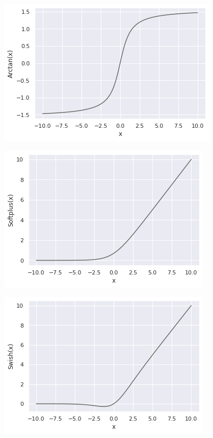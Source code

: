 \documentclass{article}
\begin{document}
\begin{minipage}{0.48\textwidth}
\end{minipage}\hspace{0.03\textwidth}%
\begin{minipage}{0.48\textwidth}
 \includegraphics[width=\linewidth]{arctan.png}
     \par
  \includegraphics[width=\linewidth]{softplus.png}
    \par
   \includegraphics[width=\linewidth]{swish.png}
    \par
\end{minipage}
\end{document}
